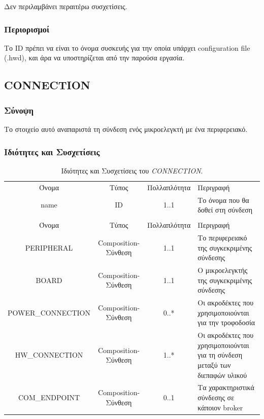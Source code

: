 \noindent Δεν περιλαμβάνει περαιτέρω συσχετίσεις.

\subsubsection*{Περιορισμοί}

\noindent Το ID πρέπει να είναι το όνομα συσκευής για την οποία υπάρχει configuration file (.hwd), και άρα να υποστηρίζεται από την παρούσα εργασία.

\subsection{CONNECTION}
\label{subsec:connection}

\subsubsection*{Σύνοψη}

\noindent Το στοιχείο αυτό αναπαριστά τη σύνδεση ενός μικροελεγκτή με ένα περιφερειακό.

\subsubsection*{Ιδιότητες και Συσχετίσεις}

\begin{table}[H]
	\begin{center}
		\begin{tabular}{ | c | c | c| m{5.5cm} | }
			\hline
			\rowcolor{Gray}
			\multicolumn{4}{|c|}{\textbf{Ιδιότητες}}\\
			\hline
			\rowcolor{Gray}
			Όνομα & Τύπος & Πολλαπλότητα & Περιγραφή \\
			\hline
			name & ID & 1..1 &  Το όνομα που θα δοθεί στη σύνδεση \\
			\hline
			\rowcolor{Gray}
			\multicolumn{4}{|c|}{\textbf{Συσχετίσεις}}\\
			\hline
			\rowcolor{Gray}
			Όνομα & Τύπος & Πολλαπλότητα & Περιγραφή \\
			\hline
			PERIPHERAL & Composition-Σύνθεση & 1..1 &  Το περιφερειακό της συγκεκριμένης σύνδεσης \\
			\hline
			BOARD & Composition-Σύνθεση & 1..1 &  Ο μικροελεγκτής της συγκεκριμένης σύνδεσης \\
			\hline
			\scriptsize{POWER\_CONNECTION} & Composition-Σύνθεση & 0..* &  Οι ακροδέκτες που χρησιμοποιούνται για την τροφοδοσία \\
			\hline
			\footnotesize{HW\_CONNECTION} & Composition-Σύνθεση & 1..* &  Οι ακροδέκτες που χρησιμοποιούνται για τη σύνδεση μεταξύ των διεπαφών υλικού \\
			\hline
			\small{COM\_ENDPOINT} & Composition-Σύνθεση & 0..1 &  Τα χαρακτηριστικά σύνδεσης σε κάποιον broker \\
			\hline
		\end{tabular}
		\caption{Ιδιότητες και Συσχετίσεις του \textit{CONNECTION}.}
		\label{tab:connection}
	\end{center}
\end{table}

